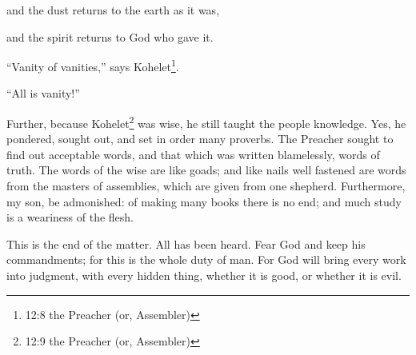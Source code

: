 \myverse{}and the dust returns to the earth as it was,

and the spirit returns to God who gave it.

\myverse{}“Vanity of vanities,” says Kohelet\footnote{12:8 the Preacher (or, Assembler)}.

“All is vanity!”

\myverse{}Further, because Kohelet\footnote{12:9 the Preacher (or, Assembler)}
was wise, he still taught the people knowledge. Yes, he pondered, sought out, and set in order many proverbs.
\myverse{}The Preacher sought to find out acceptable words, and that which was written
blamelessly, words of truth.
\myverse{}The words of the wise are like goads; and like nails well fastened are words
from the masters of assemblies, which are given from one shepherd.
\myverse{}Furthermore, my son, be admonished: of making many books there is no end;
and much study is a weariness of the flesh.

\myverse{}This is the end of the matter. All has been heard. Fear God
and keep his commandments; for this is the whole duty of man.
\myverse{}For God will bring every work into judgment, with every hidden thing, whether
it is good, or whether it is evil.


